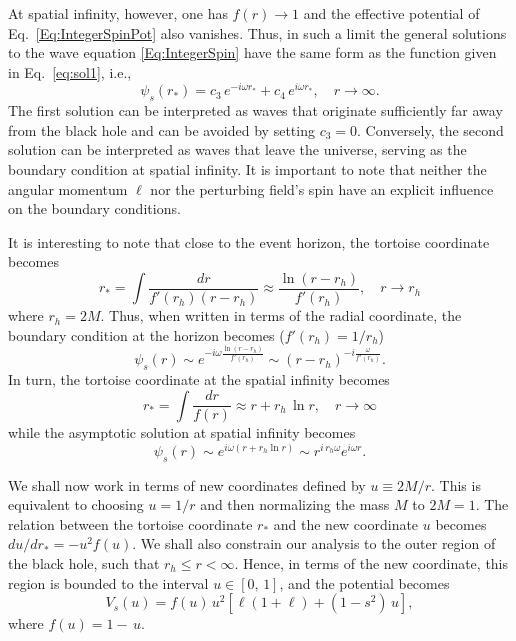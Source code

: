 At spatial infinity, however, one has $f(r)\to 1$ and the effective potential of Eq.~\eqref{Eq:IntegerSpinPot} also vanishes. Thus, in such a limit the general solutions to the wave equation \eqref{Eq:IntegerSpin} have the same form as the function given in Eq.~\ref{eq:sol1}, i.e.,
%
\begin{equation}
  \psi_{s}(r_*)=c_3\, e^{-i\omega r_*}+c_4\, e^{i\omega r_*}, \quad r\to \infty.
\end{equation}
%
The first solution can be interpreted as waves that originate sufficiently far away from the black hole and can be avoided by setting $c_3=0$. Conversely, the second solution can be interpreted as waves that leave the universe, serving as the boundary condition at spatial infinity. It is important to note that neither the angular momentum $\ell$ nor the perturbing field's spin have an explicit influence on the boundary conditions.

It is interesting to note that close to the event horizon, the tortoise coordinate becomes
%
\begin{equation}
  r_*=\int \frac{dr}{f'(r_h)(r-r_h)}\approx \frac{\ln{(r-r_h)}}{ f'(r_h)},\quad r\to r_h
\end{equation}
where $r_h=2M$.
Thus, when written in terms of the radial coordinate, the boundary condition at the horizon becomes ($f'(r_h)=1/r_h$)
%
\begin{equation}
  \psi_s(r)\sim e^{-i\omega \frac{\ln{(r-r_h)}}{f'(r_h)}}\sim \left(r-r_h\right)^{-i\frac{\omega}{f'(r_h)}}.
\end{equation}
%
In turn, the tortoise coordinate at the spatial infinity becomes
%
\begin{equation}
  r_*=\int \frac{dr}{f(r)}\approx r+r_h\,\ln{r},\quad r\to \infty
\end{equation}
%
while the asymptotic solution at spatial infinity becomes
%
\begin{equation}
  \psi_s(r)\sim e^{i\omega(r+ r_h \ln{r})}\sim r^{i\, r_h\omega}e^{i\omega r}.
\end{equation}

We shall now work in terms of new coordinates defined by $u\equiv2M/r$. This is equivalent to choosing $u=1/r$ and then normalizing the mass $M$ to $2M=1$. The relation between the tortoise coordinate $r_*$ and the new coordinate $u$  becomes $du/dr_*=-u^2f(u)$. We shall also constrain our analysis to the outer region of the black hole, such that $r_h\leq r<\infty$. Hence, in terms of the new coordinate, this region is bounded to the interval $u\in [0,\, 1]$, and the potential becomes
%
\begin{equation}
  V_{s}(u)=f(u)\,u^2\left[\ell\left(1+\ell\right)+\left(1-s^2\right)\,u\right],
\end{equation}
%
where $f(u) = 1- \,u$.

